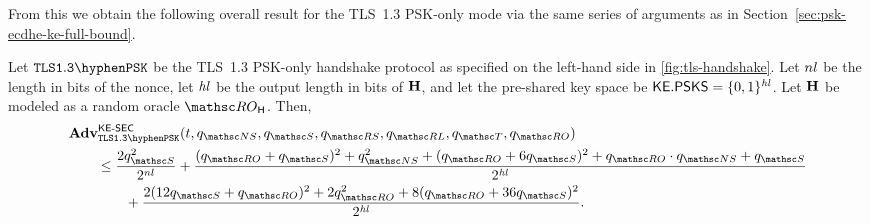 From this we obtain the following overall result for the TLS~1.3 PSK-only mode via the same series of arguments as in Section~\ref{sec:psk-ecdhe-ke-full-bound}.

\begin{corollary}\label{cor:psk-ke}
	Let $\TLSPSK$ be the TLS~1.3 PSK-only handshake protocol as specified on the left-hand side in \autoref{fig:tls-handshake}.
	Let $nl$ be the length in bits of the nonce, let $\mathit{hl}$ be the output length in bits of $\mathbf{H}$, and let the pre-shared key space be $\mathsf{KE}.\mathsf{PSKS} = \{0,1\}^{\mathit{hl}}$.
	Let $\mathbf{H}$ be modeled as a random oracle $\RO_\hash$.
	Then,
	\begin{align*}
		&\genAdv{\KESEC}{\TLSPSK}{t, \qNewSecret, \qSend, \qRevSessionKey, \qRevLongTermKey, \qTest, \qRO} \\
		&\qquad\leq \frac{2\qSend^2}{2^{\nl}} + \frac{(\qRO+\qSend)^2 + \qNewSecret^2 + (\qRO+6\qSend)^2 + \qRO \cdot \qNewSecret + \qSend}{2^{\hashlen}} \\
		&\qquad\qquad + \frac{2(12\qSend+\qRO)^2 + 2\qRO^2 + 8(\qRO+36\qSend)^2}{2^{\hashlen}}.
	\end{align*}
\end{corollary}
